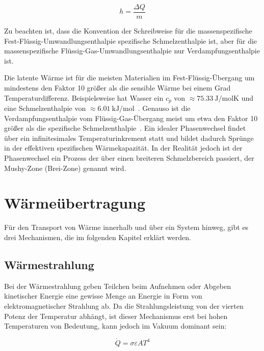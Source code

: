 \begin{equation}
    \label{eq:latente_waerme}
    h = \frac{\Delta Q}{m}
\end{equation}

Zu beachten ist, dass die Konvention der Schreibweise für die massenspezifische Fest-Flüssig-Umwandlungsenthalpie spezifische Schmelzenthalpie ist,
aber für die massenspezifische Flüssig-Gas-Umwandlungsenthalpie nur Verdampfungsenthalpie ist.

Die latente Wärme ist für die meisten Materialien im Fest-Flüssig-Übergang um mindestens den Faktor 10 größer als die sensible Wärme bei
einem Grad Temperaturdifferenz. Beispielsweise hat Wasser ein $c_p$ von $\approx\SI{75,33}{\joule\per\mole\kelvin}$ und eine Schmelzenthalpie von $\approx\SI{6,01}{\kilo\joule\per\mole}$~\cite{Wikipedia-WaterData}.
Genauso ist die Verdampfungsenthalpie vom Flüssig-Gas-Übergang meist um etwa den Faktor 10 größer als die 
spezifische Schmelzenthalpie~\cite{fusion-vaporization}.
Ein idealer Phasenwechsel findet über ein infinitesimales Temperaturinkrement statt und bildet dadurch Sprünge in der effektiven spezifischen Wärmekapazität.
In der Realität jedoch ist der Phasenwechsel ein Prozess der über einen breiteren Schmelzbereich passiert, der Mushy-Zone (Brei-Zone) genannt wird. 

\section{Wärmeübertragung}\label{sec:waermeuebertragung}

Für den Transport von Wärme innerhalb und über ein System hinweg, gibt es drei Mechanismen, die im folgenden Kapitel erklärt werden.

\subsection{Wärmestrahlung}\label{sec:strahlung}

Bei der Wärmestrahlung geben Teilchen beim Aufnehmen oder Abgeben kinetischer Energie eine gewisse Menge an Energie in Form
von elektromagnetischer Strahlung ab. Da die Strahlungsleistung von der vierten Potenz der Temperatur
abhängt, ist dieser Mechanismus erst bei hohen Temperaturen von Bedeutung, kann jedoch im Vakuum dominant sein:

\begin{equation}
    \label{eq:radiation}
    \dot{Q}=\sigma\varepsilon A T^{4}
\end{equation}

